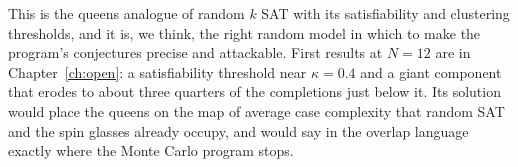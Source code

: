 This is the queens analogue of random $k$ SAT with its satisfiability and clustering thresholds, and it is, we think, the right random model in which to make the program's conjectures precise and attackable. First results at $N = 12$ are in Chapter~\ref{ch:open}: a satisfiability threshold near $\kappa = 0.4$ and a giant component that erodes to about three quarters of the completions just below it. Its solution would place the queens on the map of average case complexity that random SAT and the spin glasses already occupy, and would say in the overlap language exactly where the Monte Carlo program stops.
